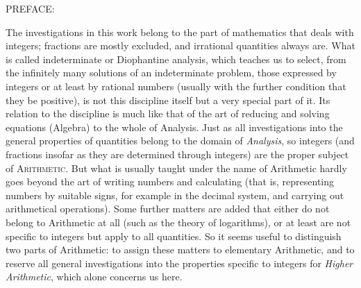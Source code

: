 \begin{center}
{\Large\textsc{PREFACE:}}

\medskip
{}
\end{center}

The investigations in this work belong to the part of mathematics that deals with integers; fractions are mostly excluded, and irrational quantities always are. What is called indeterminate or Diophantine analysis, which teaches us to select, from the infinitely many solutions of an indeterminate problem, those expressed by integers or at least by rational numbers (usually with the further condition that they be positive), is not this discipline itself but a very special part of it. Its relation to the discipline is much like that of the art of reducing and solving equations (Algebra) to the whole of Analysis. Just as all investigations into the general properties of quantities belong to the domain of \emph{Analysis}, so integers (and fractions insofar as they are determined through integers) are the proper subject of \textsc{Arithmetic}. But what is usually taught under the name of Arithmetic hardly goes beyond the art of writing numbers and calculating (that is, representing numbers by suitable signs, for example in the decimal system, and carrying out arithmetical operations). Some further matters are added that either do not belong to Arithmetic at all (such as the theory of logarithms), or at least are not specific to integers but apply to all quantities. So it seems useful to distinguish two parts of Arithmetic: to assign these matters to elementary Arithmetic, and to reserve all general investigations into the properties specific to integers for \emph{Higher Arithmetic}, which alone concerns us here.

